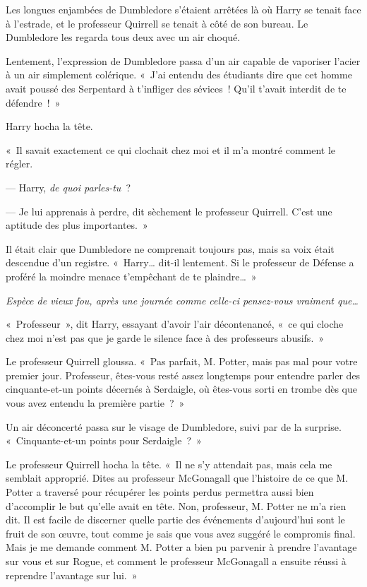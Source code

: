 Les longues enjambées de Dumbledore s'étaient arrêtées là où Harry se tenait face à l'estrade, et le professeur Quirrell se tenait à côté de son bureau. Le Dumbledore les regarda tous deux avec un air choqué.

Lentement, l'expression de Dumbledore passa d'un air capable de vaporiser l'acier à un air simplement colérique. «~J'ai entendu des étudiants dire que cet homme avait poussé des Serpentard à t'infliger des sévices~! Qu'il t'avait interdit de te défendre~!~»

Harry hocha la tête.

«~Il savait exactement ce qui clochait chez moi et il m'a montré comment le régler.

--- Harry, \emph{de quoi parles-tu}~?

--- Je lui apprenais à perdre, dit sèchement le professeur Quirrell. C'est une aptitude des plus importantes.~»

Il était clair que Dumbledore ne comprenait toujours pas, mais sa voix était descendue d'un registre. «~Harry… dit-il lentement. Si le professeur de Défense a proféré la moindre menace t'empêchant de te plaindre…~»

\emph{Espèce de vieux fou, après une journée comme celle-ci pensez-vous vraiment que…}

«~Professeur~», dit Harry, essayant d'avoir l'air décontenancé, «~ce qui cloche chez moi n'est pas que je garde le silence face à des professeurs abusifs.~»

Le professeur Quirrell gloussa. «~Pas parfait, M. Potter, mais pas mal pour votre premier jour. Professeur, êtes-vous resté assez longtemps pour entendre parler des cinquante-et-un points décernés à Serdaigle, où êtes-vous sorti en trombe dès que vous avez entendu la première partie~?~»

Un air déconcerté passa sur le visage de Dumbledore, suivi par de la surprise. «~Cinquante-et-un points pour Serdaigle~?~»

Le professeur Quirrell hocha la tête. «~Il ne s'y attendait pas, mais cela me semblait approprié. Dites au professeur McGonagall que l'histoire de ce que M. Potter a traversé pour récupérer les points perdus permettra aussi bien d'accomplir le but qu'elle avait en tête. Non, professeur, M. Potter ne m'a rien dit. Il est facile de discerner quelle partie des événements d'aujourd'hui sont le fruit de son œuvre, tout comme je sais que vous avez suggéré le compromis final. Mais je me demande comment M. Potter a bien pu parvenir à prendre l'avantage sur vous et sur Rogue, et comment le professeur McGonagall a ensuite réussi à reprendre l'avantage sur lui.~»

